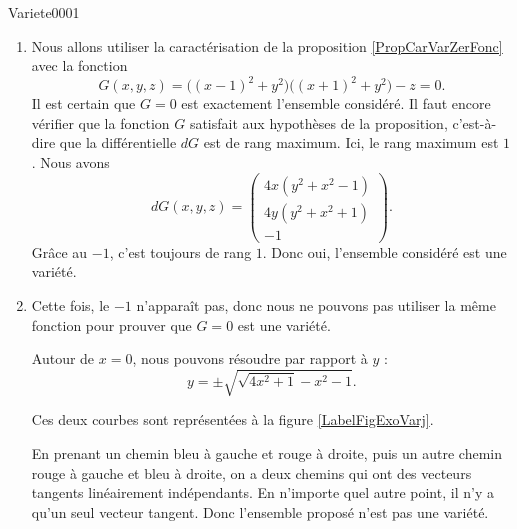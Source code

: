 \begin{corrige}{Variete0001}
\begin{enumerate}
		\item
		      Nous allons utiliser la caractérisation de la proposition \ref{PropCarVarZerFonc} avec la fonction
		      \begin{equation}
			      G(x,y,z)=\big( (x-1)^2+y^2 \big)\big( (x+1)^2+y^2 \big)-z=0.
		      \end{equation}
		      Il est certain que $G=0$ est exactement l'ensemble considéré. Il faut encore vérifier que la fonction $G$ satisfait aux hypothèses de la proposition, c'est-à-dire que la différentielle $dG$ est de rang maximum. Ici, le rang maximum est $1$. Nous avons
		      \begin{equation}
			      dG(x,y,z)=
			      \begin{pmatrix}
				      4x(y^2+x^2-1) \\
				      4y(y^2+x^2+1) \\
				      -1
			      \end{pmatrix}.
		      \end{equation}
		      Grâce au $-1$, c'est toujours de rang $1$. Donc oui, l'ensemble considéré est une variété.

		\item
		      Cette fois, le $-1$ n'apparaît pas, donc nous ne pouvons pas utiliser la même fonction pour prouver que $G=0$ est une variété.

		      Autour de $x=0$, nous pouvons résoudre par rapport à $y$ :
		      \begin{equation}
			      y=\pm\sqrt{  \sqrt{4x^2+1}-x^2-1   }.
		      \end{equation}

		      Ces deux courbes sont représentées à la figure \ref{LabelFigExoVarj}.
		      \newcommand{\CaptionFigExoVarj}{Ce à quoi ça ressemble. En bleu la partie sans le signe, et en rouge avec le signe moins.}
		      

		      En prenant un chemin bleu à gauche et rouge à droite, puis un autre chemin rouge à gauche et bleu à droite, on a deux chemins qui ont des vecteurs tangents linéairement indépendants.
		      En n'importe quel autre point, il n'y a qu'un seul vecteur tangent. Donc l'ensemble proposé n'est pas une variété.


	\end{enumerate}

\end{corrige}
